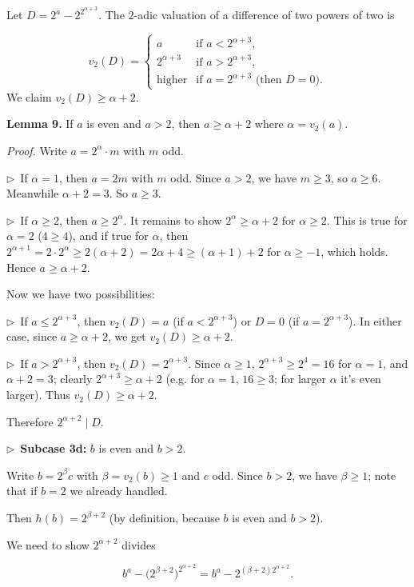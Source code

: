 \documentclass{llmxive}
\providecommand{\compactbullet}[1]{\par\noindent$\triangleright$~#1\par}
\begin{document}
Let \(D = 2^{a} - 2^{2^{\alpha+3}}\). The \(2\)-adic valuation of a difference of two powers of two is\par
\[
    v_{2}(D) = \begin{cases}
    a & \text{if } a < 2^{\alpha+3},\\
    2^{\alpha+3} & \text{if } a > 2^{\alpha+3},\\
    \text{higher} & \text{if } a = 2^{\alpha+3} \text{ (then } D=0\text{)}.
    \end{cases}
    \]
We claim \(v_{2}(D)\ge\alpha+2\).\par
\textbf{Lemma 9.} If \(a\) is even and \(a>2\), then \(a \ge \alpha+2\) where \(\alpha=v_{2}(a)\).\par
\emph{Proof.} Write \(a = 2^{\alpha}\cdot m\) with \(m\) odd.\par
\compactbullet{If \(\alpha = 1\), then \(a = 2m\) with \(m\) odd. Since \(a>2\), we have \(m\ge3\), so \(a\ge6\). Meanwhile \(\alpha+2 = 3\). So \(a \ge 3\).}
\compactbullet{If \(\alpha \ge 2\), then \(a \ge 2^{\alpha}\). It remains to show \(2^{\alpha} \ge \alpha+2\) for \(\alpha\ge2\). This is true for \(\alpha=2\) (\(4\ge4\)), and if true for \(\alpha\), then \(2^{\alpha+1} = 2\cdot2^{\alpha} \ge 2(\alpha+2) = 2\alpha+4 \ge (\alpha+1)+2\) for \(\alpha\ge -1\), which holds. Hence \(a \ge \alpha+2\).}
Now we have two possibilities:\par
\compactbullet{If \(a \le 2^{\alpha+3}\), then \(v_{2}(D) = a\) (if \(a < 2^{\alpha+3}\)) or \(D=0\) (if \(a = 2^{\alpha+3}\)). In either case, since \(a \ge \alpha+2\), we get \(v_{2}(D) \ge \alpha+2\).}
\compactbullet{If \(a > 2^{\alpha+3}\), then \(v_{2}(D) = 2^{\alpha+3}\). Since \(\alpha\ge1\), \(2^{\alpha+3} \ge 2^{4}=16\) for \(\alpha=1\), and \(\alpha+2=3\); clearly \(2^{\alpha+3} \ge \alpha+2\) (e.g. for \(\alpha=1\), \(16\ge3\); for larger \(\alpha\) it's even larger). Thus \(v_{2}(D) \ge \alpha+2\).}
Therefore \(2^{\alpha+2}\mid D\).\par
\compactbullet{\textbf{Subcase 3d: }\(b\) is even and \(b>2\).\textbf{}}
Write \(b = 2^{\beta}c\) with \(\beta = v_{2}(b)\ge1\) and \(c\) odd. Since \(b>2\), we have \(\beta\ge1\); note that if \(b=2\) we already handled.\par
Then \(h(b) = 2^{\beta+2}\) (by definition, because \(b\) is even and \(b>2\)).\par
We need to show \(2^{\alpha+2}\) divides\par
\[
    b^{a} - \bigl(2^{\beta+2}\bigr)^{2^{\alpha+2}} = b^{a} - 2^{(\beta+2)2^{\alpha+2}}.
    \]
\end{document}
